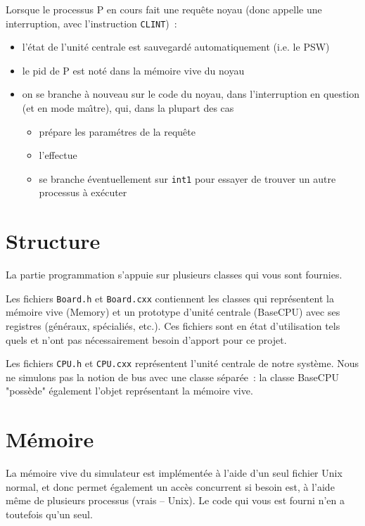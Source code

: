 \documentclass{article}
\begin{document}
Lorsque le processus P en cours fait une requ\^ete noyau (donc appelle une
interruption, avec l'instruction \texttt{CLINT})~:

\begin{itemize}
\item l'\'etat de l'unit\'e centrale est sauvegard\'e automatiquement
  (i.e. le PSW)
\item le pid de P est not\'e dans la m\'emoire vive du noyau
\item on se branche \`a nouveau sur le code du noyau, dans l'interruption en
  question (et en mode
  ma\^\i tre), qui, dans la plupart des cas
\begin{itemize}
\item pr\'epare les param\'etres de la requ\^ete 
\item l'effectue
\item se branche \'eventuellement sur \texttt{int1} pour essayer de trouver un
  autre   processus \`a ex\'ecuter 
\end{itemize}
\end{itemize}

\section{Structure}

La partie programmation s'appuie sur plusieurs classes qui vous sont fournies.

Les fichiers \texttt{Board.h} et \texttt{Board.cxx} contiennent les classes
qui repr\'esentent la m\'emoire vive (Memory) et un prototype d'unit\'e
centrale (BaseCPU) avec ses registres (g\'en\'eraux, sp\'eciali\'es,
etc.). Ces fichiers sont en \'etat d'utilisation tels quels et n'ont pas
n\'ecessairement besoin d'apport pour ce projet. 

Les fichiers \texttt{CPU.h} et \texttt{CPU.cxx} repr\'esentent l'unit\'e
centrale de notre syst\`eme. Nous ne simulons pas la notion de bus avec une
classe s\'epar\'ee~: la classe BaseCPU "poss\`ede" \'egalement l'objet
repr\'esentant la m\'emoire vive. 

\section{M\'emoire}

La m\'emoire vive du simulateur est impl\'ement\'ee \`a l'aide d'un seul
fichier Unix normal, et donc permet \'egalement un acc\`es concurrent si
besoin est, \`a l'aide m\^eme de plusieurs processus (vrais -- Unix). Le code
qui vous est fourni n'en a toutefois qu'un seul. 
\end{document}
